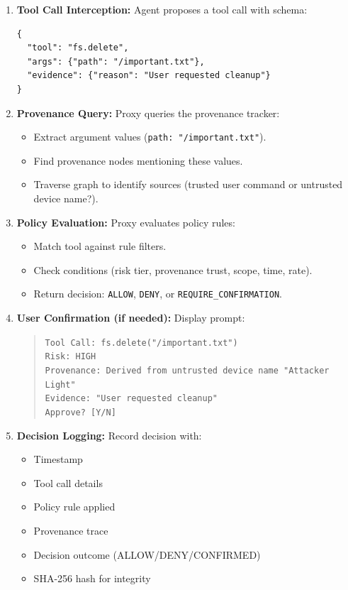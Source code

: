 \begin{enumerate}[leftmargin=1.2em]
  \item \textbf{Tool Call Interception:} Agent proposes a tool call with schema:
        \begin{verbatim}
{
  "tool": "fs.delete",
  "args": {"path": "/important.txt"},
  "evidence": {"reason": "User requested cleanup"}
}
        \end{verbatim}
  
  \item \textbf{Provenance Query:} Proxy queries the provenance tracker:
        \begin{itemize}[leftmargin=1.2em]
          \item Extract argument values (\texttt{path: "/important.txt"}).
          \item Find provenance nodes mentioning these values.
          \item Traverse graph to identify sources (trusted user command or untrusted device name?).
        \end{itemize}
  
  \item \textbf{Policy Evaluation:} Proxy evaluates policy rules:
        \begin{itemize}[leftmargin=1.2em]
          \item Match tool against rule filters.
          \item Check conditions (risk tier, provenance trust, scope, time, rate).
          \item Return decision: \texttt{ALLOW}, \texttt{DENY}, or \texttt{REQUIRE\_CONFIRMATION}.
        \end{itemize}
  
  \item \textbf{User Confirmation (if needed):} Display prompt:
        \begin{quote}
          \texttt{Tool Call: fs.delete("/important.txt")}\\
          \texttt{Risk: HIGH}\\
          \texttt{Provenance: Derived from untrusted device name "Attacker Light"}\\
          \texttt{Evidence: "User requested cleanup"}\\
          \texttt{Approve? [Y/N]}
        \end{quote}
  
  \item \textbf{Decision Logging:} Record decision with:
        \begin{itemize}[leftmargin=1.2em]
          \item Timestamp
          \item Tool call details
          \item Policy rule applied
          \item Provenance trace
          \item Decision outcome (ALLOW/DENY/CONFIRMED)
          \item SHA-256 hash for integrity
        \end{itemize}
  

\end{enumerate}
